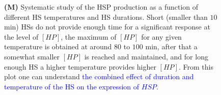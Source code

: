 \documentclass[oneside, 10pt, a4paper, twocolumn]{article}
\begin{document}
\begin{figure}
{{%
\textbf{(M)} Systematic study of the HSP production as a function of different HS temperatures and HS durations. Short (smaller than $10$ min) HSs do not provide enough time for a significant response at the level of $\left[HP\right]$, the maximum of $\left[HP\right]$ for any given temperature is obtained at around $80$ to $100$ min, after that a somewhat smaller $\left[HP\right]$ is reached and maintained, and for long enough HS a higher temperature provides higher $\left[HP\right]$. From this plot one can understand \textcolor{blue}{the combined effect of duration and temperature of the HS on the expression of $HSP$.}}
}
\label{Figure8label}
\end{figure}
\end{document}
